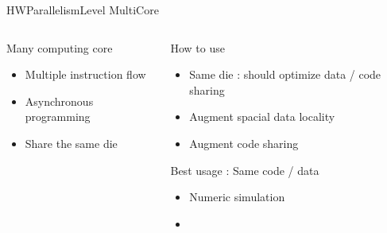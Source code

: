%
\begin{Frame}{HWParallelismLevel MultiCore}
  \begin{columns}[t]
    \begin{column}{\HW} %
      \begin{block}{Many computing core}
        \begin{itemize}
        \item Multiple instruction flow
        \item Asynchronous programming
        \item Share the same die
        \end{itemize}
      \end{block} 
    \end{column}
    
    \begin{column}{\HW} %
      \begin{block}{How to use}
        \begin{itemize}
        \item Same die : should optimize data / code sharing
        \item Augment spacial data locality
        \item Augment code sharing
        \end{itemize}
      \end{block}   
      \begin{alertblock}{Best usage : Same code / data}
        \begin{itemize}
        \item Numeric simulation
        \item 
        \end{itemize}
      \end{alertblock}   
    \end{column}
  \end{columns}  
\end{Frame}


